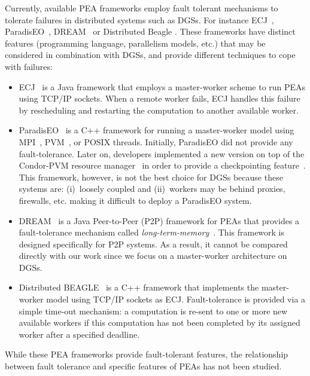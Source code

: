 \documentclass[graybox]{sty/svmult}
\begin{document}
Currently, available PEA frameworks employ fault tolerant mechanisms to tolerate failures in distributed systems such as DGSs.
For instance ECJ~\cite{ecj}, ParadisEO~\cite{paradiseo}, DREAM~\cite{dream} or Distributed Beagle
\cite{master-slave-framework-beagle}. These frameworks have distinct features (programming language, parallelism models,
etc.) that may be considered in combination with DGSs, and provide different techniques to cope with failures:
\begin{itemize}
    \item ECJ~\cite{ecj} is a Java framework that employs a master-worker scheme to run PEAs using TCP/IP sockets. When a remote
        worker fails, ECJ handles this failure by rescheduling and restarting the computation to another available worker. 
    \item ParadisEO~\cite{paradiseo} is a C++ framework for running a master-worker model using MPI~\cite{mpi}, PVM~\cite{pvm}, or POSIX threads. Initially, ParadisEO did not provide any fault-tolerance. Later on, developers  implemented a new version on top of the Condor-PVM resource manager~\cite{condor-pvm} in order to provide a checkpointing feature~\cite{biblia-checkpointing}.
        This framework, however, is not the best choice for DGSs because these systems are: (i)~loosely coupled 
        and (ii)~workers may be behind proxies, firewalls, etc. making it difficult to deploy a ParadisEO system. 
    \item DREAM~\cite{dream} is a Java Peer-to-Peer (P2P) framework for PEAs that provides a
        fault-tolerance mechanism called \emph{long-term-memory}~\cite{epidemic-algorithms-fault-tolerance-dream}. This framework is designed specifically for P2P systems. As a result, it cannot be compared directly with our work since we focus on a master-worker architecture on DGSs. 
    \item  Distributed BEAGLE~\cite{master-slave-framework-beagle} is a C++ framework that implements the
         master-worker model using TCP/IP sockets as ECJ. Fault-tolerance is provided via a simple time-out
         mechanism: a computation is re-sent to one or more new available workers if
         this computation has not been completed by its assigned worker after a specified deadline.
\end{itemize}
\noindent
While these PEA frameworks provide fault-tolerant features, the relationship between
fault tolerance and specific features of PEAs has not been studied.
\end{document}
